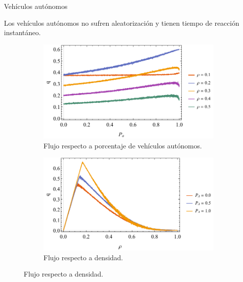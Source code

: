 \documentclass[final]{beamer}
\newlength{\onecolwid}
\newlength{\twocolwid}
\begin{document}
\begin{frame}[t]
\begin{columns}[t]
\begin{column}{\twocolwid}
\begin{columns}[t,totalwidth=\twocolwid]
\begin{column}{\onecolwid}

\begin{block}{Vehículos autónomos}

Los vehículos autónomos no sufren aleatorización y tienen tiempo de reacción instantáneo.

\begin{figure}[h!]
\begin{subfigure}{.5\textwidth}
	\centering
	\includegraphics[scale=1.1]{img/flow_vs_aut_cars}
	\caption{Flujo respecto a porcentaje de vehículos autónomos.}
\end{subfigure}%
\begin{subfigure}{.5\textwidth}
	\centering
	\includegraphics[scale=1.1]{img/flow_vs_density_aut}
	\caption{Flujo respecto a densidad.}
\end{subfigure}%
\end{figure}

\end{block}


\end{column}
\end{columns}
\end{column}
\end{columns}
\end{frame}
\end{document}

